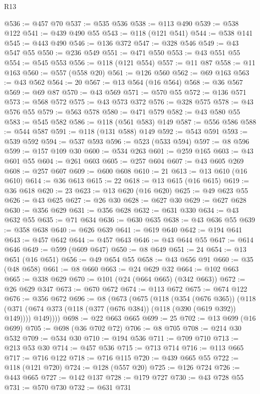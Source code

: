\begin{lexlean}{R13}
\begin{coremodule}
@536 := @457 @70
@537 := @535 @536
@538 := @113 @490
@539 := @538 @122
@541 := @439 @490 @55
@543 := @118 (@121 @541)
@544 := @538 @141
@545 := @443 @490
@546 := @136 @372
@547 := @328 @546
@549 := @43 @547 @55
@550 := @236 @549
@551 := @471 @550
@553 := @43 @551 @55
@554 := @545 @553
@556 := @118 (@121 @554)
@557 := @11 @87
@558 := @11 @163
@560 := @557 (@558 @20)
@561 := @126 @560
@562 := @69 @163
@563 := @43 @562
@564 := 20
@567 := @13 @564 (@16 @564)
@568 := @36 @567
@569 := @69 @87
@570 := @43 @569
@571 := @570 @55
@572 := @136 @571
@573 := @568 @572
@575 := @43 @573 @372
@576 := @328 @575
@578 := @43 @576 @55
@579 := @563 @578
@580 := @471 @579
@582 := @43 @580 @55
@583 := @545 @582
@586 := @118 (@561 @583) @149
@587 := @556 @586
@588 := @544 @587
@591 := @118 (@131 @588) @149
@592 := @543 @591
@593 := @539 @592
@594 := @537 @593
@596 := @523 (@533 @594)
@597 := @8 @596
@599 := @157 @109 @30
@600 := @534 @263
@601 := @259 @165
@603 := @43 @601 @55
@604 := @261 @603
@605 := @257 @604
@607 := @43 @605 @269
@608 := @257 @607
@609 := @600 @608
@610 := 21
@613 := @13 @610 (@16 @610)
@614 := @36 @613
@615 := 22
@618 := @13 @615 (@16 @615)
@619 := @36 @618
@620 := 23
@623 := @13 @620 (@16 @620)
@625 := @49 @623 @55
@626 := @43 @625
@627 := @26 @30
@628 := @627 @30
@629 := @627 @628
@630 := @356 @629
@631 := @356 @628
@632 := @631 @330
@634 := @43 @632 @55
@635 := @71 @634
@636 := @630 @635
@638 := @43 @636 @55
@639 := @358 @638
@640 := @626 @639
@641 := @619 @640
@642 := @194 @641
@643 := @457 @642
@644 := @457 @643
@646 := @43 @644 @55
@647 := @614 @646
@649 := @599 (@609 @647)
@650 := @8 @649
@651 := 24
@654 := @13 @651 (@16 @651)
@656 := @49 @654 @55
@658 := @43 @656 @91
@660 := @35 (@48 @658)
@661 := @8 @660
@663 := @24 @629 @32
@664 := @102 @663
@665 := @338 @629
@670 := @101 (@24 (@664 @665) (@342 @663))
@672 := @26 @629 @347
@673 := @670 @672
@674 := @113 @672
@675 := @674 @122
@676 := @356 @672
@696 := @8
    (@673
      (@675
        (@118
          (@354 (@676 @365))
          (@118 (@371 (@674 @373 (@118 (@377 (@676 @384)) (@118 (@390 (@619 @392)) @149)))) @149))))
@698 := @22 @663 @665
@699 := 25
@702 := @13 @699 (@16 @699)
@705 := @698 (@36 @702 @72)
@706 := @8 @705
@708 := @214 @30 @532
@709 := @534 @30
@710 := @194 @536
@711 := @709 @710
@713 := @213 @53 @30
@714 := @457 @536
@715 := @713 @714
@716 := @113 @665
@717 := @716 @122
@718 := @716 @115
@720 := @439 @665 @55
@722 := @118 (@121 @720)
@724 := @128 (@557 @20)
@725 := @126 @724
@726 := @443 @665
@727 := @142 @137
@728 := @179 @727
@730 := @43 @728 @55
@731 := @570 @730
@732 := @631 @731

\end{coremodule}
\end{lexlean}
